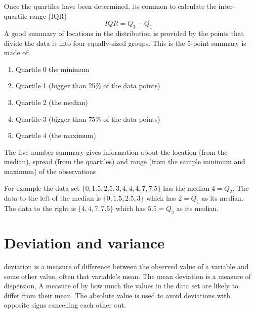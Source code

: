 Once the quartiles have been determined, its common to calculate the inter-quartile range (IQR)
\begin{equation}
IQR = Q_3 - Q_1
\end{equation}
A good summary of locations in the distribution is provided by the points that divide the data it into four equally-sized groups. This is the 5-point summary is made of:
\begin{enumerate}
    \item Quartile 0 the minimum
    \item Quartile 1 (bigger than 25\% of the data points)
    \item Quartile 2 (the median)
    \item Quartile 3 (bigger than 75\% of the data points)
    \item Quartile 4 (the maximum)
\end{enumerate}
The five-number summary gives information about the location (from the median), spread (from the quartiles) and range (from the sample minimum and maximum) of the observations

For example the data set $\{0, 1.5, 2.5, 3, 4, 4, 4, 7, 7.5\}$ has the median $4 = Q_2$. The data to the left of the median is $\{0, 1.5, 2.5, 3\}$ which has $2 = Q_1$ as its median. The data to the right is $\{4, 4, 7, 7.5\}$ which has $5.5 = Q_3$ as its median.



\section{Deviation and variance}
deviation is a measure of difference between the observed value of a variable and some other value, often that variable's mean. The mean deviation is a measure of dispersion, A measure of by how much the values in the data set are likely to differ from their mean. The absolute value is used to avoid deviations with opposite signs cancelling each other out.

